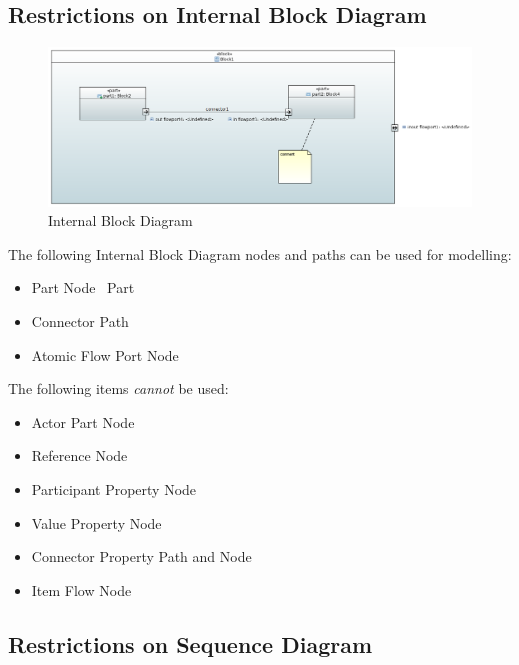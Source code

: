 \subsection{Restrictions on Internal Block Diagram}



\begin{figure}[ht]
  \centering
  \includegraphics[width=\textwidth]{images/IBDDiagram.PNG}
  \caption{Internal Block Diagram}
  \label{fig:ibd}
\end{figure}


The following Internal Block Diagram nodes and paths can be used for
modelling:
\begin{itemize}
\item Part Node ~\textsf{Part}
\item Connector Path 
\item Atomic Flow Port Node 
   
\end{itemize}

The following items \emph{cannot} be used:
\begin{itemize}
\item Actor Part Node
\item Reference Node
\item Participant Property Node
\item Value Property Node
\item Connector Property Path and Node
\item Item Flow Node
\end{itemize}

\subsection{Restrictions on Sequence Diagram}



